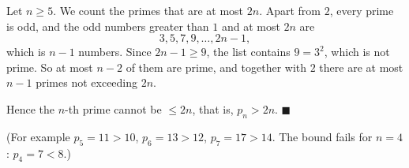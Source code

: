 Let $n\ge5$. We count the primes that are at most $2n$. Apart from $2$, every prime is odd, and the odd numbers greater than $1$ and at most $2n$ are
\[
3,5,7,9,\dots,2n-1,
\]
which is $n-1$ numbers. Since $2n-1\ge9$, the list contains $9=3^2$, which is not prime. So at most $n-2$ of them are prime, and together with $2$ there are at most $n-1$ primes not exceeding $2n$.

Hence the $n$-th prime cannot be $\le2n$, that is, $p_n>2n$. $\blacksquare$

(For example $p_5=11>10$, $p_6=13>12$, $p_7=17>14$. The bound fails for $n=4$: $p_4=7<8$.)
